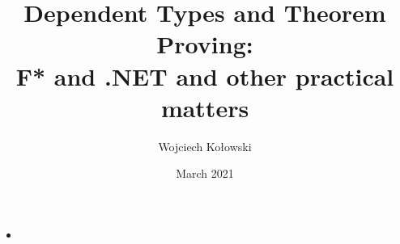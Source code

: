 \documentclass{beamer}
\title{Dependent Types and Theorem Proving: \\F* and .NET and other practical matters}
\author{Wojciech Kołowski}
\date{March 2021}
\begin{document}
\frame{\titlepage}
\frame{\tableofcontents}

\begin{frame}{}
\begin{itemize}
	\item 
\end{itemize}
\end{frame}
\end{document}
